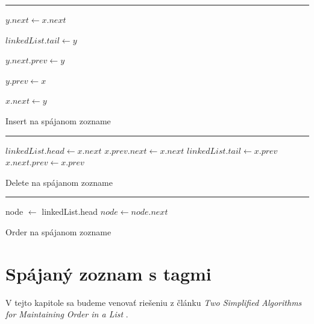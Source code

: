 \documentclass[
  digital,     %
  oneside,     %
  nosansbold,  %
  nocolorbold, %
  lof,         %
  lot,         %
]{fithesis4}
\begin{document}
\begin{algorithm}
\hrule\vspace{0.2em}
$y.next \leftarrow x.next$\;

{
    $linkedList.tail \leftarrow y$\;
}

\Else
{
    $y.next.prev \leftarrow y$\;
}

$y.prev \leftarrow x$\;

$x.next \leftarrow y$\;

\caption{Insert na spájanom zozname}
\end{algorithm}

\begin{algorithm}
\hrule\vspace{0.2em}
{
    $linkedList.head \leftarrow x.next$\;
}
\Else
{
    $x.prev.next \leftarrow x.next$\;
}
{
    $linkedList.tail \leftarrow x.prev$\;
}
\Else
{
    $x.next.prev \leftarrow x.prev$\;
}
\caption{Delete na spájanom zozname}
\end{algorithm}

\begin{algorithm}
\hrule\vspace{0.2em}
node $\leftarrow$ linkedList.head\;
{
    {
        \;
    }
    {
        \;
    }
    $node \leftarrow node.next$\;
}
\caption{Order na spájanom zozname}
\end{algorithm}


\chapter{Spájaný zoznam s tagmi}

V tejto kapitole sa budeme venovať riešeniu z článku \textit{Two Simplified Algorithms for Maintaining Order in a List} \cite{paper1_ordered_list}.
\end{document}
